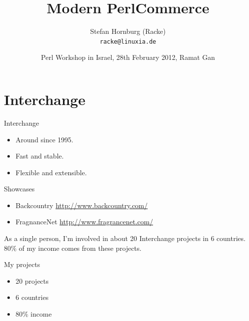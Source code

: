 
\usepackage[T1]{fontenc}
\usepackage{mathptmx}
\usepackage[scaled=.90]{helvet}
\usepackage{courier}

\usepackage{beamerthemesplit}
\usepackage{verbatim}
\usepackage{hyperref}
\usepackage{listings}
\lstset{language=Perl,basicstyle=\footnotesize,tabsize=3,showstringspaces=false}


\title{Modern PerlCommerce}
\author[racke]{Stefan Hornburg (Racke)\\ \texttt{racke@linuxia.de}}
\date[]{Perl Workshop in Israel, 28th February 2012, Ramat Gan}


\maketitle{}

\begin{frame}
  \titlepage
\end{frame}

\tableofcontents

\section{Interchange}

\begin{frame}{Interchange}
\begin{itemize}
\item Around since 1995.
\item Fast and stable.
\item Flexible and extensible.
\end{itemize}
\end{frame}

\begin{frame}{Showcases}
\begin{itemize}
\item Backcountry \url{http://www.backcountry.com/}
\item FragnanceNet \url{http://www.fragrancenet.com/}
\end{itemize}
\end{frame}

As a single person, I'm involved in about 20 Interchange
projects in 6 countries. 80\% of my income comes from
these projects.

\begin{frame}{My projects}
\begin{itemize}
\item 20 projects
\item 6 countries
\item 80\% income
\end{itemize}
\end{frame}

